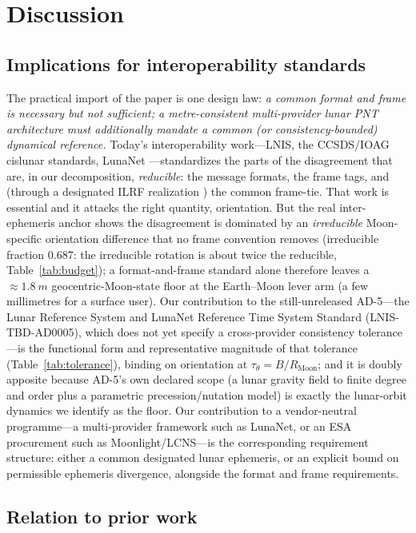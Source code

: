 \section{Discussion}
\label{sec:discussion}

\subsection{Implications for interoperability standards}

The practical import of the paper is one design law: \emph{a common format and frame
is necessary but not sufficient; a metre-consistent multi-provider lunar PNT
architecture must additionally mandate a common (or consistency-bounded) dynamical
reference.} Today's interoperability work---LNIS, the CCSDS/IOAG cislunar standards,
LunaNet \citep{lnis2023,ioag2022lunar,israel2020lunanet}---standardizes the parts of
the disagreement that are, in our decomposition, \emph{reducible}: the message
formats, the frame tags, and (through a designated ILRF realization
\citep{sosnica2025ilrf}) the common frame-tie. That work is essential and it attacks
the right quantity, orientation. But the real inter-ephemeris anchor shows the
disagreement is dominated by an \emph{irreducible} Moon-specific orientation
difference that no frame convention removes (irreducible fraction $0.687$: the
irreducible rotation is about twice the reducible, Table~\ref{tab:budget}); a
format-and-frame standard alone therefore leaves a $\approx\!\SI{1.8}{m}$
geocentric-Moon-state floor at the Earth--Moon lever arm (a few millimetres for a
surface user). Our contribution to the still-unreleased AD-5---the Lunar Reference
System and LunaNet Reference Time System Standard ({LNIS-TBD-AD0005}), which does not
yet specify a cross-provider consistency tolerance---is the functional form and
representative magnitude of that tolerance (Table~\ref{tab:tolerance}), binding on
orientation at $\tau_\theta=B/R_{\mathrm{Moon}}$; and it is doubly apposite because
AD-5's own declared scope (a lunar gravity field to finite degree and order plus a
parametric precession/nutation model) is exactly the lunar-orbit dynamics we identify
as the floor. Our contribution to a vendor-neutral programme---a multi-provider
framework such as LunaNet, or an ESA procurement such as Moonlight/LCNS---is the
corresponding requirement structure: either a common designated lunar ephemeris, or an
explicit bound on permissible ephemeris divergence, alongside the format and frame
requirements.

\subsection{Relation to prior work}

